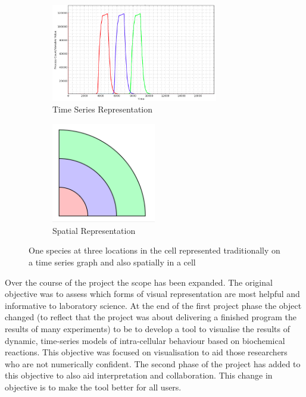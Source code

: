 \begin{figure}[h!]
    \centering
    \begin{subfigure}[b]{0.4\textwidth}
        \centering
        \includegraphics[width=0.8\textwidth]{images/asrc_graph_intro.png}
        \caption{Time Series Representation}
        \label{fig:asrc_graph_intro}
    \end{subfigure}
    \begin{subfigure}[b]{0.4\textwidth}
        \centering
        \includegraphics[width=0.5\textwidth]{images/asrc_cell_intro.png}
        \caption{Spatial Representation}
        \label{fig:asrc_cell_intro}
    \end{subfigure}
    \caption{One species at three locations in the cell represented traditionally on a time series graph and also spatially in a cell}
    \label{fig:asrc_intro}
\end{figure}


Over the course of the project the scope has been expanded.  The original objective was to assess which forms of visual representation are most helpful and informative to laboratory science.  At the end of the first project phase the object changed (to reflect that the project was about delivering a finished program the results of many experiments) to be to develop a tool to visualise the results of dynamic, time-series models of intra-cellular behaviour based on biochemical reactions.  This objective was focused on visualisation to aid those researchers who are not numerically confident.  The second phase of the project has added to this objective to also aid interpretation and collaboration.  This change in objective is to make the tool better for all users.

